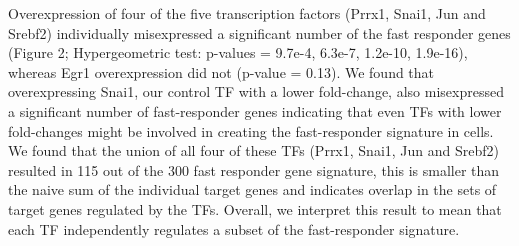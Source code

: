 Overexpression of four of the five transcription factors (Prrx1, Snai1, Jun and Srebf2) individually misexpressed a significant number of the fast responder genes (Figure 2; Hypergeometric test: p-values = 9.7e-4, 6.3e-7, 1.2e-10, 1.9e-16), whereas Egr1 overexpression did not (p-value = 0.13). We found that overexpressing Snai1, our control TF with a lower fold-change, also misexpressed a significant number of fast-responder genes indicating that even TFs with lower fold-changes might be involved in creating the fast-responder signature in cells. We found that the union of all four of these TFs (Prrx1, Snai1, Jun and Srebf2) resulted in 115 out of the 300 fast responder gene signature, this is smaller than the naive sum of the individual target genes and indicates overlap in the sets of target genes regulated by the TFs. Overall, we interpret this result to mean that each TF independently regulates a subset of the fast-responder signature.

